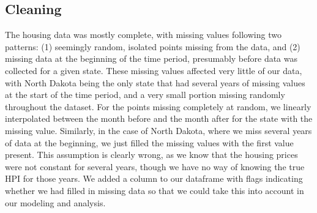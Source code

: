 \documentclass[11pt]{amsart}
\begin{document}
\subsection{Cleaning}
The housing data was mostly complete, with missing values following two patterns: (1) seemingly random, isolated points missing from the data, and (2) missing data at the beginning of the time period, presumably before data was collected for a given state.
These missing values affected very little of our data, with North Dakota being the only state that had several years of missing values at the start of the time period, and a very small portion missing randomly throughout the dataset.
For the points missing completely at random, we linearly interpolated between the month before and the month after for the state with the missing value.
Similarly, in the case of North Dakota, where we miss several years of data at the beginning, we just filled the missing values with the first value present.
This assumption is clearly wrong, as we know that the housing prices were not constant for several years, though we have no way of knowing the true HPI for those years. We added a column to our dataframe with flags indicating whether we had filled in missing data so that we could take this into account in our modeling and analysis.
\end{document}

